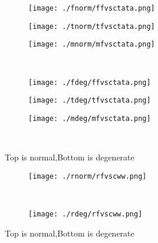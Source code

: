 \documentclass[aps,floats,floatfix,nofootinbib]{revtex4-1}
\begin{document}
\begin{center}
\begin{figure}
\begin{subfigure}{0.3\textwidth}
\texttt{[image: ./fnorm/ffvsctata.png]}
\label{}
\end{subfigure}
\begin{subfigure}{0.3\textwidth}
\texttt{[image: ./tnorm/tfvsctata.png]}
\label{}
\end{subfigure}
\begin{subfigure}{0.3\textwidth}
\texttt{[image: ./mnorm/mfvsctata.png]}
\label{}
\end{subfigure}\\
\begin{subfigure}{0.3\textwidth}
\texttt{[image: ./fdeg/ffvsctata.png]}
\label{}
\end{subfigure}
\begin{subfigure}{0.3\textwidth}
\texttt{[image: ./tdeg/tfvsctata.png]}
\label{}
\end{subfigure}
\begin{subfigure}{0.3\textwidth}
\texttt{[image: ./mdeg/mfvsctata.png]}
\label{}
\end{subfigure}\\
\caption{Top is normal,Bottom is degenerate}
\end{figure}
\end{center}

\begin{center}
\begin{figure}
\begin{subfigure}{0.95\textwidth}
\texttt{[image: ./rnorm/rfvscww.png]}
\label{}
\end{subfigure}\\
\begin{subfigure}{0.95\textwidth}
\texttt{[image: ./rdeg/rfvscww.png]}
\label{}
\end{subfigure}
\caption{Top is normal,Bottom is degenerate}
\end{figure}
\end{center}
\end{document}
